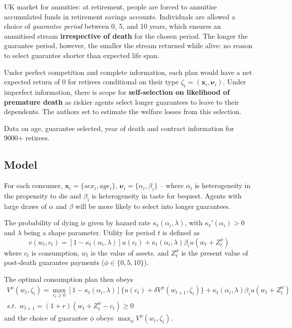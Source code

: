 \documentclass[11pt]{article}
\numberwithin{equation}{section}
\begin{document}
UK market for annuities: at retirement, people are forced to annuitise accumulated funds in retirement savings accounts.
Individuals are allowed a choice of \textit{guarantee period} between 0, 5, and 10 years, which ensures an annuitised stream \textbf{irrespective of death} for the chosen period.
The longer the guarantee period, however, the smaller the stream returned while alive: no reason to select guarantee shorter than expected life span.

Under perfect competition and complete information, each plan would have a net expected return of 0 for retirees conditional on their type $\zeta_i = (\mathbf{x}_i, \mathbf{\nu}_i)$.
Under imperfect information, there is scope for \textbf{self-selection on likelihood of premature death} as riskier agents select longer guarantees to leave to their dependents.
The authors set to estimate the welfare losses from this selection.

Data on age, guarantee selected, year of death and contract information for 9000+ retirees.

\subsection{Model}

For each consumer, $\mathbf{x}_i = \{sex_i, age_i\}$, $\mathbf{\nu}_i = \{\alpha_i, \beta_i\}$ -- where $\alpha_i$ is heterogeneity in the propensity to die and $\beta_i$ is heterogeneity in taste for bequest.
Agents with large draws of $\alpha$ and $\beta$ will be more likely to select into longer guarantees.

The probability of dying is given by hazard rate $\kappa_t(\alpha_i, \lambda)$, with $\kappa_t'(\alpha_i) > 0$ and $\lambda$ being a shape parameter.
Utility for period $t$ is defined as
\begin{equation}
	v(w_t, c_t) = [1-\kappa_t(\alpha_i, \lambda)]u(c_t) + \kappa_t(\alpha_i, \lambda) \beta_i u(w_t + Z_t^\phi)
\end{equation}
where $c_t$ is consumption, $w_t$ is the value of assets, and $Z^\phi_t$ is the present value of post-death guarantee payments ($\phi \in \{0,5,10\}$).

The optimal consumption plan then obeys
\begin{equation}
	\begin{gathered}
		\label{bellman}
	V^\phi (w_t, \zeta_i) = \max_{c_t \geq 0}[1-\kappa_t(\alpha_i, \lambda)]\{u(c_t) + \delta V^\phi (w_{t+1}, \zeta_i)\} + \kappa_t(\alpha_i, \lambda) \beta_i u(w_t + Z_t^\phi) \\
	s.t. ~~ w_{t+1} = (1+r)(w_t + Z_t^\phi - c_t) \geq 0
		\end{gathered}
\end{equation}
and the choice of guarantee $\phi$ obeys $\max_\phi V^\phi (w_t, \zeta_i)$. \\
\end{document}
